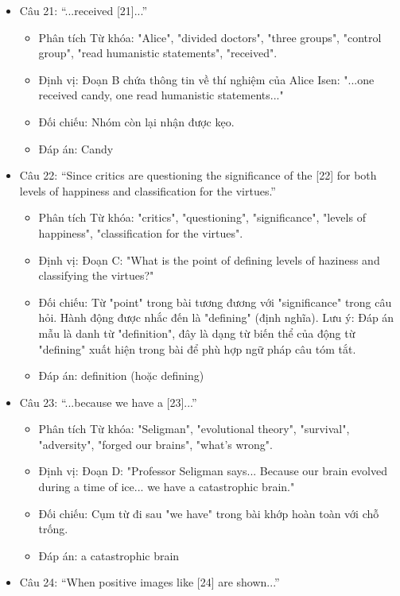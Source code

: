 \documentclass{../templateReading/cdreading}
\begin{document}
\begin{itemize}
\item Câu 21: “...received [21]...”
\begin{itemize}
\item Phân tích Từ khóa: "Alice", "divided doctors", "three groups", "control group", "read humanistic statements", "received".
\item Định vị: Đoạn B chứa thông tin về thí nghiệm của Alice Isen: "...one received candy, one read humanistic statements..."
\item Đối chiếu: Nhóm còn lại nhận được kẹo.
\item Đáp án: Candy
\end{itemize}
\item Câu 22: “Since critics are questioning the significance of the [22] for both levels of happiness and classification for the virtues.”
\begin{itemize}
\item Phân tích Từ khóa: "critics", "questioning", "significance", "levels of happiness", "classification for the virtues".
\item Định vị: Đoạn C: "What is the point of defining levels of haziness and classifying the virtues?"
\item Đối chiếu: Từ "point" trong bài tương đương với "significance" trong câu hỏi. Hành động được nhắc đến là "defining" (định nghĩa). Lưu ý: Đáp án mẫu là danh từ "definition", đây là dạng từ biến thể của động từ "defining" xuất hiện trong bài để phù hợp ngữ pháp câu tóm tắt.
\item Đáp án: definition (hoặc defining)
\end{itemize}
\item Câu 23: “...because we have a [23]...”
\begin{itemize}
\item Phân tích Từ khóa: "Seligman", "evolutional theory", "survival", "adversity", "forged our brains", "what’s wrong".
\item Định vị: Đoạn D: "Professor Seligman says... Because our brain evolved during a time of ice... we have a catastrophic brain."
\item Đối chiếu: Cụm từ đi sau "we have" trong bài khớp hoàn toàn với chỗ trống.
\item Đáp án: a catastrophic brain
\end{itemize}
\item Câu 24: “When positive images like [24] are shown...”
\begin{itemize}

\end{itemize}
\end{itemize}
\end{document}
